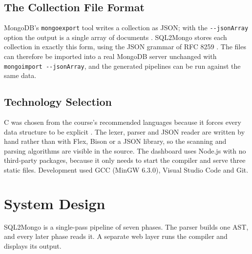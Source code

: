 \documentclass[12pt,a4paper]{report}
\newcommand{\codeus}{\textunderscore\allowbreak}
\DeclareRobustCommand{\code}[1]{\texttt{\let\_\codeus #1}}
\begin{document}
\section{The Collection File Format}
MongoDB's \code{mongoexport} tool writes a collection as JSON; with the \code{-{}-jsonArray} option the output is a single array of documents \cite{mongoexport}. SQL2Mongo stores each collection in exactly this form, using the JSON grammar of RFC 8259 \cite{json}. The files can therefore be imported into a real MongoDB server unchanged with \code{mongoimport -{}-jsonArray}, and the generated pipelines can be run against the same data.

\section{Technology Selection}
C was chosen from the course's recommended languages because it forces every data structure to be explicit \cite{kr}. The lexer, parser and JSON reader are written by hand rather than with Flex, Bison or a JSON library, so the scanning and parsing algorithms are visible in the source. The dashboard uses Node.js with no third-party packages, because it only needs to start the compiler and serve three static files. Development used GCC (MinGW 6.3.0), Visual Studio Code and Git.

\chapter{System Design}
SQL2Mongo is a single-pass pipeline of seven phases. The parser builds one AST, and every later phase reads it. A separate web layer runs the compiler and displays its output.
\end{document}
